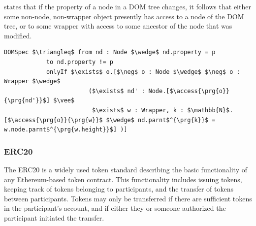  states that if the property of a node in a DOM tree changes,
it follows that either some non-node, non-wrapper object presently has 
access to a node of the DOM tree, or to some wrapper with access to some 
ancestor of the node that was modified.
\begin{lstlisting}[language = Chainmail, mathescape=true, frame=lines]
DOMSpec $\triangleq$ from nd : Node $\wedge$ nd.property = p
            to nd.property != p
            onlyIf $\exists$ o.[$\neg$ o : Node $\wedge$ $\neg$ o : Wrapper $\wedge$ 
                        ($\exists$ nd' : Node.[$\access{\prg{o}}{\prg{nd'}}$] $\vee$ 
                         $\exists$ w : Wrapper, k : $\mathbb{N}$.[$\access{\prg{o}}{\prg{w}}$ $\wedge$ nd.parnt$^{\prg{k}}$ = w.node.parnt$^{\prg{w.height}}$] )]
\end{lstlisting}

\subsubsection{ERC20}
The ERC20\cite{ERC20} is a widely used token standard describing the basic functionality of any Ethereum-based token 
contract. This functionality includes issuing tokens, keeping track of tokens belonging to participants, and the 
transfer of tokens between participants. Tokens may only be transferred if there are sufficient tokens in the 
participant's account, and if either they  or someone authorized  the participant  initiated the transfer. 

